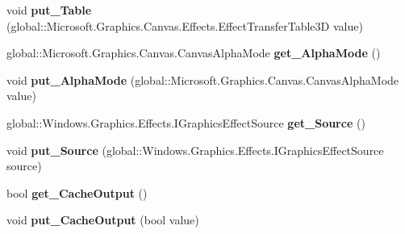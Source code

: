 \begin{DoxyCompactItemize}
void {\bfseries put\+\_\+\+Table} (global\+::\+Microsoft.\+Graphics.\+Canvas.\+Effects.\+Effect\+Transfer\+Table3D value)
\item 
\mbox{\label{class_microsoft_1_1_graphics_1_1_canvas_1_1_effects_1_1_table_transfer3_d_effect_ae5fb4228975aa7d022d2195c1982b82d}} 
global\+::\+Microsoft.\+Graphics.\+Canvas.\+Canvas\+Alpha\+Mode {\bfseries get\+\_\+\+Alpha\+Mode} ()
\item 
\mbox{\label{class_microsoft_1_1_graphics_1_1_canvas_1_1_effects_1_1_table_transfer3_d_effect_a72566b9b3a7e95c18cd980ff24a9d5d8}} 
void {\bfseries put\+\_\+\+Alpha\+Mode} (global\+::\+Microsoft.\+Graphics.\+Canvas.\+Canvas\+Alpha\+Mode value)
\item 
\mbox{\label{class_microsoft_1_1_graphics_1_1_canvas_1_1_effects_1_1_table_transfer3_d_effect_a2f23f417bf05d4c1d8141d26fd77d028}} 
global\+::\+Windows.\+Graphics.\+Effects.\+I\+Graphics\+Effect\+Source {\bfseries get\+\_\+\+Source} ()
\item 
\mbox{\label{class_microsoft_1_1_graphics_1_1_canvas_1_1_effects_1_1_table_transfer3_d_effect_aa854b194fd96e1bd1b1ef104afdd668a}} 
void {\bfseries put\+\_\+\+Source} (global\+::\+Windows.\+Graphics.\+Effects.\+I\+Graphics\+Effect\+Source source)
\item 
\mbox{\label{class_microsoft_1_1_graphics_1_1_canvas_1_1_effects_1_1_table_transfer3_d_effect_a8cceb510d568b68eb23b56875273f943}} 
bool {\bfseries get\+\_\+\+Cache\+Output} ()
\item 
\mbox{\label{class_microsoft_1_1_graphics_1_1_canvas_1_1_effects_1_1_table_transfer3_d_effect_ade1f6bddc7fa0cf496ff30604d784fd2}} 
void {\bfseries put\+\_\+\+Cache\+Output} (bool value)
\item 
\mbox{\label{class_microsoft_1_1_graphics_1_1_canvas_1_1_effects_1_1_table_transfer3_d_effect_a994ad0cba8e8d81128956cd66d3bfbb0}} 

\end{DoxyCompactItemize}
